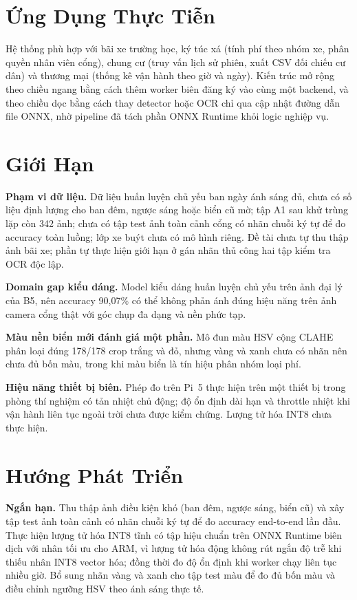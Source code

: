 \section{Ứng Dụng Thực Tiễn}

Hệ thống phù hợp với bãi xe trường học, ký túc xá (tính phí theo nhóm xe, phân quyền nhân
viên cổng), chung cư (truy vấn lịch sử phiên, xuất CSV đối chiếu cư dân) và thương mại (thống
kê vận hành theo giờ và ngày). Kiến trúc mở rộng theo chiều ngang bằng cách thêm worker biên
đăng ký vào cùng một backend, và theo chiều dọc bằng cách thay detector hoặc OCR chỉ qua cập
nhật đường dẫn file ONNX, nhờ pipeline đã tách phần ONNX Runtime khỏi logic nghiệp vụ.

\section{Giới Hạn}

\textbf{Phạm vi dữ liệu.} Dữ liệu huấn luyện chủ yếu ban ngày ánh sáng đủ, chưa có số liệu
định lượng cho ban đêm, ngược sáng hoặc biển cũ mờ; tập A1 sau khử trùng lặp còn 342 ảnh;
chưa có tập test ảnh toàn cảnh cổng có nhãn chuỗi ký tự để đo accuracy toàn luồng; lớp xe
buýt chưa có mô hình riêng. Đề tài chưa tự thu thập ảnh bãi xe; phần tự thực hiện giới hạn ở
gán nhãn thủ công hai tập kiểm tra OCR độc lập.

\textbf{Domain gap kiểu dáng.} Model kiểu dáng huấn luyện chủ yếu trên ảnh đại lý của B5, nên
accuracy 90,07\% có thể không phản ánh đúng hiệu năng trên ảnh camera cổng thật với góc chụp
đa dạng và nền phức tạp.

\textbf{Màu nền biển mới đánh giá một phần.} Mô đun màu HSV cộng CLAHE phân loại đúng 178/178
crop trắng và đỏ, nhưng vàng và xanh chưa có nhãn nên chưa đủ bốn màu, trong khi màu biển là
tín hiệu phân nhóm loại phí.

\textbf{Hiệu năng thiết bị biên.} Phép đo trên Pi~5 thực hiện trên một thiết bị trong phòng
thí nghiệm có tản nhiệt chủ động; độ ổn định dài hạn và throttle nhiệt khi vận hành liên tục
ngoài trời chưa được kiểm chứng. Lượng tử hóa INT8 chưa thực hiện.

\section{Hướng Phát Triển}
\label{sec:huongphattrien}

\textbf{Ngắn hạn.} Thu thập ảnh điều kiện khó (ban đêm, ngược sáng, biển cũ) và xây tập test
ảnh toàn cảnh có nhãn chuỗi ký tự để đo accuracy end-to-end lần đầu. Thực hiện lượng tử hóa
INT8 tĩnh có tập hiệu chuẩn trên ONNX Runtime biên dịch với nhân tối ưu cho ARM, vì lượng tử
hóa động không rút ngắn độ trễ khi thiếu nhân INT8 vector hóa; đồng thời đo độ ổn định khi
worker chạy liên tục nhiều giờ. Bổ sung nhãn vàng và xanh cho tập test màu để đo đủ bốn màu và điều
chỉnh ngưỡng HSV theo ánh sáng thực tế.

